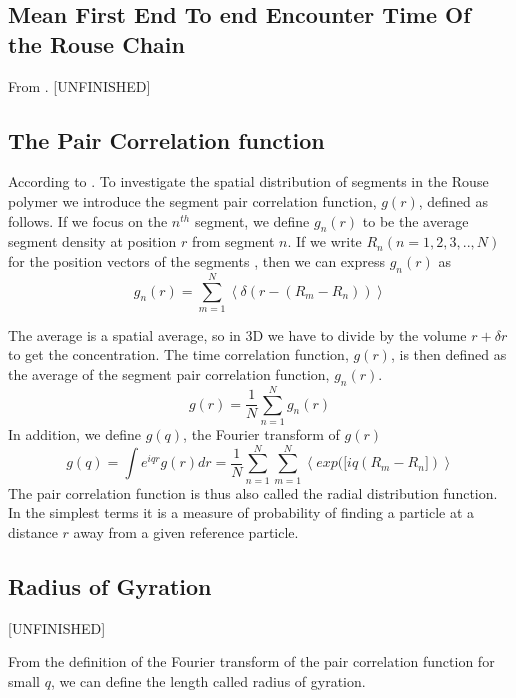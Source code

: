 \documentclass{paper}
\begin{document}
\subsection{Mean First End To end Encounter Time Of the Rouse Chain}\label{subsection_meanEndToEndEncounterTimeOfTheRouseChain}
From \cite{amitai2012computation}. [UNFINISHED]

\subsection{The Pair Correlation function}\label{subsection_thePairCorrelationFunction}
According to \cite{doi1996introduction}. To investigate the spatial distribution of segments in the Rouse polymer we introduce the segment pair correlation function, $g(r)$, defined as follows. If we focus on the $n^{th}$ segment, we define $g_n(r)$ to be the average segment density at position $r$ from segment $n$. If we write $R_n(n=1,2,3,..,N)$ for the position vectors of the segments , then we can express $g_n(r)$ as 
\begin{equation*}
g_n(r)=\sum_{m=1}^N \left<\delta(r-(R_m-R_n)) \right>
\end{equation*} 

The average is a spatial average, so in 3D we have to divide by the volume $r+\delta r$ to get the concentration. The time correlation function, $g(r)$, is then defined as the average of the segment pair correlation function, $g_n(r)$. 
\begin{equation*}
g(r) = \frac{1}{N}\sum_{n=1}^{N}g_n(r)
\end{equation*}
In addition, we define $g(q)$, the Fourier transform of $g(r)$
\begin{equation*}
g(q) = \int e^{iqr}g(r)dr = \frac{1}{N}\sum\limits_{n=1}^{N}\sum\limits_{m=1}^{N}\left<exp([iq(R_m-R_n]) \right>
\end{equation*}
The pair correlation function is thus also called the radial distribution function. In the simplest terms it is a measure of probability of finding a particle at a distance $r$ away from a given reference particle. 


\subsection{Radius of Gyration}\label{subsection_radiusOfGyration}
[UNFINISHED]

From the definition of the Fourier transform of the pair correlation function for small $q$, we can define the length called radius of gyration. 
\end{document}
